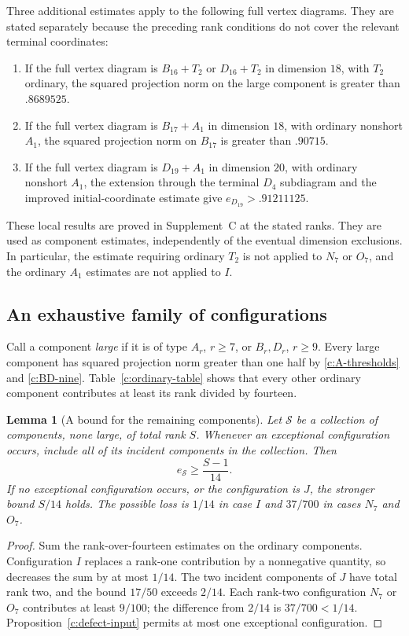 \documentclass[11pt]{article}
\newtheorem{lemma}[theorem]{Lemma}
\theoremstyle{definition}
\theoremstyle{remark}
\numberwithin{equation}{section}
\begin{document}
Three additional estimates apply to the following full vertex
diagrams. They are stated separately because the preceding rank
conditions do not cover the relevant terminal coordinates:
\begin{enumerate}[label=\textup{(\roman*)}]
\item If the full vertex diagram is $B_{16}+T_2$ or $D_{16}+T_2$ in
 dimension $18$, with $T_2$ ordinary, the squared projection norm on
 the large component is greater than $.8689525$.
\item If the full vertex diagram is $B_{17}+A_1$ in dimension $18$,
 with ordinary nonshort $A_1$, the squared projection norm on $B_{17}$ is
 greater than $.90715$.
\item If the full vertex diagram is $D_{19}+A_1$ in dimension $20$,
 with ordinary nonshort $A_1$, the extension through the terminal
 $D_4$ subdiagram and the improved initial-coordinate estimate give
 $e_{D_{19}}>.91211125$.
\end{enumerate}
These local results are proved in Supplement~C at the stated ranks.
They are used as component estimates, independently of the eventual
dimension exclusions. In particular, the estimate requiring ordinary
$T_2$ is not applied to $N_7$ or $O_7$, and the ordinary $A_1$
estimates are not applied to $I$.

\subsection{An exhaustive family of configurations}
\label{c:cover}

Call a component \emph{large} if it is of type $A_r$, $r\ge7$,
or $B_r,D_r$, $r\ge9$. Every large component has squared projection norm
greater than one half by \eqref{c:A-thresholds} and
\eqref{c:BD-nine}. Table~\ref{c:ordinary-table} shows that every
other ordinary component contributes at least its rank divided by
fourteen.

\begin{lemma}[A bound for the remaining components]\label{c:spectator}
Let $\mathcal S$ be a collection of components, none large, of total
rank $S$. Whenever an exceptional configuration occurs, include all
of its incident components in the collection. Then
\begin{equation}\label{c:spectator-rate}
                          e_{\mathcal S}\ge\frac{S-1}{14}.
\end{equation}
If no exceptional configuration occurs, or the configuration is $J$,
the stronger bound $S/14$ holds. The possible loss is $1/14$ in
case $I$ and $37/700$ in cases $N_7$ and $O_7$.
\end{lemma}
\begin{proof}
Sum the rank-over-fourteen estimates on the ordinary components.
Configuration $I$ replaces a rank-one contribution by a nonnegative
quantity, so decreases the sum by at most $1/14$. The two incident
components of $J$ have total rank two, and the bound $17/50$ exceeds
$2/14$. Each rank-two configuration $N_7$ or $O_7$ contributes at
least $9/100$; the difference from $2/14$ is $37/700<1/14$.
Proposition~\ref{c:defect-input} permits at most one exceptional
configuration.
\end{proof}
\end{document}
